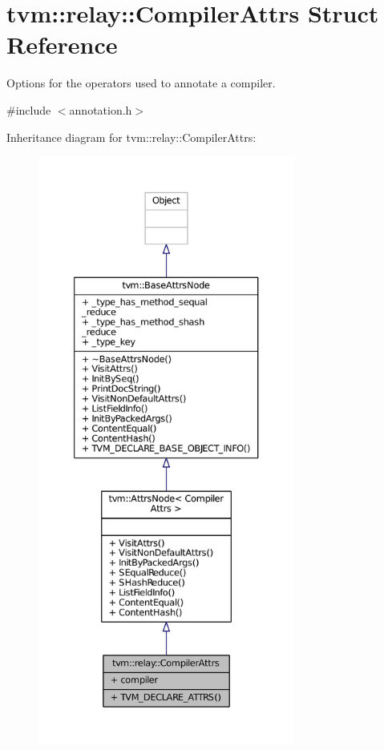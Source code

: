\hypertarget{structtvm_1_1relay_1_1CompilerAttrs}{}\section{tvm\+:\+:relay\+:\+:Compiler\+Attrs Struct Reference}
\label{structtvm_1_1relay_1_1CompilerAttrs}


Options for the operators used to annotate a compiler.  




{\ttfamily \#include $<$annotation.\+h$>$}



Inheritance diagram for tvm\+:\+:relay\+:\+:Compiler\+Attrs\+:
\nopagebreak
\begin{figure}[H]
\begin{center}
\leavevmode
\includegraphics[height=550pt]{structtvm_1_1relay_1_1CompilerAttrs__inherit__graph}
\end{center}
\end{figure}


